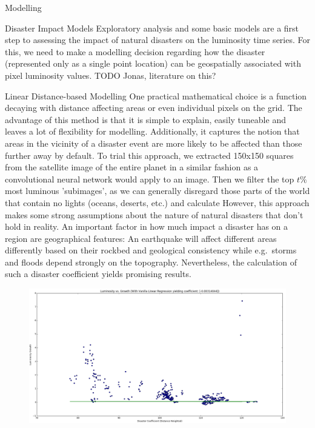 \documentclass[12pt,fleqn,leqno,letterpaper]{article}
\begin{document}
\begin{section}{Modelling}
  \begin{subsection}{Disaster Impact Models}
    Exploratory analysis and some basic models are a first step to assessing the impact of natural disasters on the luminosity time series. For this, we need to make a modelling decision regarding how the disaster (represented only as a single point location) can be geospatially associated with pixel luminosity values. TODO Jonas, literature on this?
    \begin{subsubsection}{Linear Distance-based Modelling}
      One practical mathematical choice is a function decaying with distance affecting areas or even individual pixels on the grid. The advantage of this method is that it is simple to explain, easily tuneable and leaves a lot of flexibility for modelling. Additionally, it captures the notion that areas in the vicinity of a disaster event are more likely to be affected than those further away by default.
      To trial this approach, we extracted 150x150 squares from the satellite image of the entire planet in a similar fashion as a convolutional neural network would apply to an image. Then we filter the top $t\%$ most luminous 'subimages', as we can generally disregard those parts of the world that contain no lights (oceans, deserts, etc.) and calculate 
      However, this approach makes some strong assumptions about the nature of natural disasters that don't hold in reality. An important factor in how much impact a disaster has on a region are geographical features: An earthquake will affect different areas differently based on their rockbed and geological consistency while e.g.\ storms and floods depend strongly on the topography. Nevertheless, the calculation of such a disaster coefficient yields promising results.
      \begin{figure}
        \centering
        \includegraphics[width=1\linewidth]{linear-model-1}\label{fig:linear-model-1} %

\end{figure}
\end{subsubsection}
\end{subsection}
\end{section}
\end{document}
